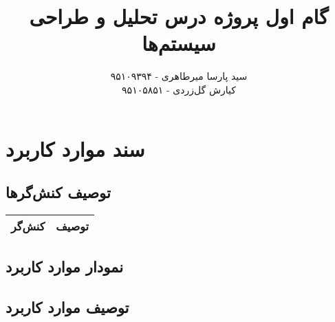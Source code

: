 \documentclass{article}
\title{\textbf{گام اول پروژه درس تحلیل و طراحی سیستم‌ها}}
\author{سید پارسا میرطاهری - ۹۵۱۰۹۳۹۴ \\ کیارش گل‌زردی - ۹۵۱۰۵۸۵۱}
\begin{document}
\date{}

\maketitle

\section{سند موارد کاربرد}

\subsection{توصیف کنش‌گرها}

\begin{center}
\begin{tabular} {|p{}|p{}|}
\hline
\textbf{کنش‌گر}
&
\textbf{توصیف}
\\ \hline	
\end{tabular}	
\end{center}

\subsection{نمودار موارد کاربرد}

\subsection{توصیف موارد کاربرد}
\end{document}
